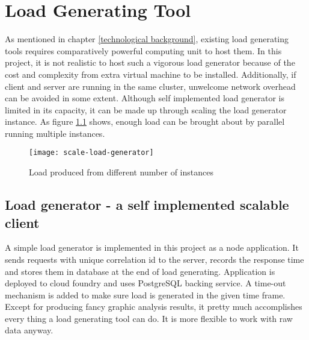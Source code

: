 \chapter{Load Generating Tool}
	\label{scale-load-generator}
As mentioned in chapter \ref{technological background}, existing load generating tools requires comparatively powerful computing unit to host them. In this project, it is not realistic to host such a vigorous load generator because of the cost and complexity from extra virtual machine to be installed. Additionally, if client and server are running in the same cluster, unwelcome network overhead can be avoided in some extent. Although self implemented load generator is limited in its capacity, it can be made up through scaling the load generator instance. As figure  \ref{scale-load-generator} shows, enough load can be brought about by parallel running multiple instances.
\begin{figure}[h]
	\centering
	\texttt{[image: scale-load-generator]}
	\caption{Load produced from different number of instances}
	\label{scale-load-generator}
\end{figure}

\section{Load generator - a self implemented scalable client}
A simple load generator is implemented in this project as a node application. It sends requests with unique correlation id to the server, records the response time and stores them in database at the end of load generating. Application is deployed to cloud foundry and uses PostgreSQL backing service. A time-out mechanism is added to make sure load is generated in the given time frame. Except for producing fancy graphic analysis results, it pretty much accomplishes every thing a load generating tool can do. It is more flexible to work with raw data anyway.


